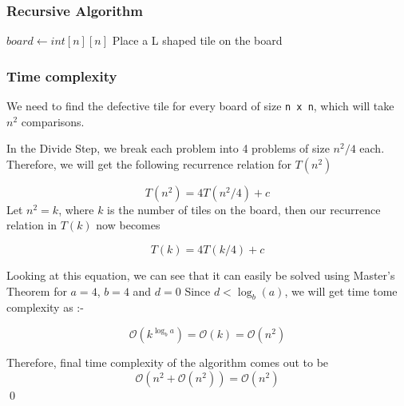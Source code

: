 \documentclass[12pt]{article}
\begin{document}
\subsubsection{Recursive Algorithm}


\begin{algorithm}
    \begin{algorithmic}[1]

        \Ensure $board \leftarrow int[n][n]$
        \State Place a L shaped tile on the board
        \Else


        \EndIf
    \end{algorithmic}
\end{algorithm}

\pagebreak

\subsubsection{Time complexity}

We need to find the defective tile for every board of size \texttt{n x n}, which will take $n^2$ comparisons.

In the Divide Step, we break each problem into 4 problems of size $n^2/4$ each. Therefore, we will get the following recurrence relation for $T(n^2)$





$$T(n^2) = 4T(n^2/4) + c$$
Let $n^2 = k$, where $k$ is the number of tiles on the board, then our recurrence relation in $T(k)$ now becomes

$$T(k) = 4T(k/4) + c$$


Looking at this equation, we can see that it can easily be solved using Master's Theorem for $a = 4$, $b = 4$ and $d = 0$
Since $d < \log_b(a)$, we will get time tome complexity as  :-

$$\mathcal{O}(k^{\log_b{a}}) = \mathcal{O}(k) = \mathcal{O}(n^2)$$

Therefore, final time complexity of the algorithm comes out to be $$\mathcal{O}(n^2 + \mathcal{O}(n^2)) = \mathcal{O}(n^2) $$
{\qed}
\end{document}
